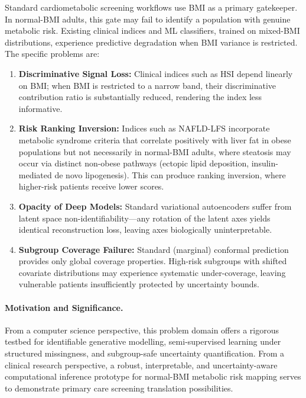 \documentclass[12pt,a4paper,oneside]{report}
\begin{document}
Standard cardiometabolic screening workflows use BMI as a primary gatekeeper. In normal-BMI adults, this gate may fail to identify a population with genuine metabolic risk. Existing clinical indices and ML classifiers, trained on mixed-BMI distributions, experience predictive degradation when BMI variance is restricted. The specific problems are:

\begin{enumerate}[leftmargin=*]
    \item \textbf{Discriminative Signal Loss:} Clinical indices such as HSI depend linearly on BMI; when BMI is restricted to a narrow band, their discriminative contribution ratio is substantially reduced, rendering the index less informative.

    \item \textbf{Risk Ranking Inversion:} Indices such as NAFLD-LFS incorporate metabolic syndrome criteria that correlate positively with liver fat in obese populations but not necessarily in normal-BMI adults, where steatosis may occur via distinct non-obese pathways (ectopic lipid deposition, insulin-mediated de novo lipogenesis). This can produce ranking inversion, where higher-risk patients receive lower scores.

    \item \textbf{Opacity of Deep Models:} Standard variational autoencoders suffer from latent space non-identifiability---any rotation of the latent axes yields identical reconstruction loss, leaving axes biologically uninterpretable.

    \item \textbf{Subgroup Coverage Failure:} Standard (marginal) conformal prediction provides only global coverage properties. High-risk subgroups with shifted covariate distributions may experience systematic under-coverage, leaving vulnerable patients insufficiently protected by uncertainty bounds.
\end{enumerate}

\paragraph{Motivation and Significance.} From a computer science perspective, this problem domain offers a rigorous testbed for identifiable generative modelling, semi-supervised learning under structured missingness, and subgroup-safe uncertainty quantification. From a clinical research perspective, a robust, interpretable, and uncertainty-aware computational inference prototype for normal-BMI metabolic risk mapping serves to demonstrate primary care screening translation possibilities.
\end{document}

